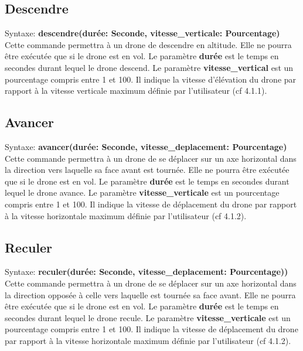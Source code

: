 \documentclass[12pt, openany]{report}
\begin{document}
\subsection{Descendre}
\quad Syntaxe: \textbf{descendre(durée: Seconde, vitesse\_verticale: Pourcentage)} \\
Cette commande permettra à un drone de descendre en altitude. 
Elle ne pourra être exécutée que si le drone est en vol.
Le paramètre \textbf{durée} est le temps en secondes durant lequel le drone descend. 
Le paramètre \textbf{vitesse\_vertical} est un pourcentage compris entre 1 et 100. Il indique la vitesse d'élévation du drone par rapport à la vitesse verticale maximum définie par l'utilisateur (cf 4.1.1).\\

\subsection{Avancer}
\quad Syntaxe: \textbf{avancer(durée: Seconde, vitesse\_deplacement: Pourcentage)} \\
Cette commande permettra à un drone de se déplacer sur un axe horizontal dans la direction vers laquelle sa face avant est tournée. 
Elle ne pourra être exécutée que si le drone est en vol.
Le paramètre \textbf{durée} est le temps en secondes durant lequel le drone avance. 
Le paramètre \textbf{vitesse\_verticale} est un pourcentage compris entre 1 et 100. Il indique la vitesse de déplacement du drone par rapport à la vitesse horizontale maximum définie par l'utilisateur (cf 4.1.2). \\

\subsection{Reculer}
\quad Syntaxe: \textbf{reculer(durée: Seconde, vitesse\_deplacement: Pourcentage))} \\
Cette commande permettra à un drone de se déplacer sur un axe horizontal dans la direction opposée à celle vers laquelle est tournée sa face avant. 
Elle ne pourra être exécutée que si le drone est en vol.
Le paramètre \textbf{durée} est le temps en secondes durant lequel le drone recule. 
Le paramètre \textbf{vitesse\_verticale} est un pourcentage compris entre 1 et 100. Il indique la vitesse de déplacement du drone par rapport à la vitesse horizontale maximum définie par l'utilisateur (cf 4.1.2). \\
\end{document}
